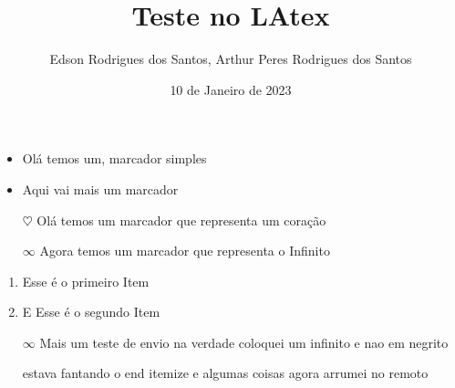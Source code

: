 \documentclass[12pt,a4paper,brazil,oneside]{book}
\title{Teste no LAtex}
\author{Edson Rodrigues dos Santos, Arthur Peres Rodrigues dos Santos}
\date{10 de Janeiro de 2023}
\begin{document}
\maketitle\newpage

\begin{itemize}
 \item Olá temos um, marcador 
 simples
 \item Aqui vai mais um marcador
 
\end{itemize}

\begin{itemize}
	\item[$\heartsuit$] Olá temos um marcador que representa um coração 
	\item[$\infty$] Agora temos um marcador que representa o Infinito
\end{itemize}

\begin{enumerate}
	\item Esse é o {primeiro} Item
	\item E Esse é o {segundo} Item
\end{enumerate}

\begin{itemize}
	\item[$\infty$] Mais um teste de envio na verdade coloquei um infinito e nao em negrito 
	
	estava fantando o end itemize e algumas coisas agora arrumei no remoto

\end{itemize}
\end{document}
